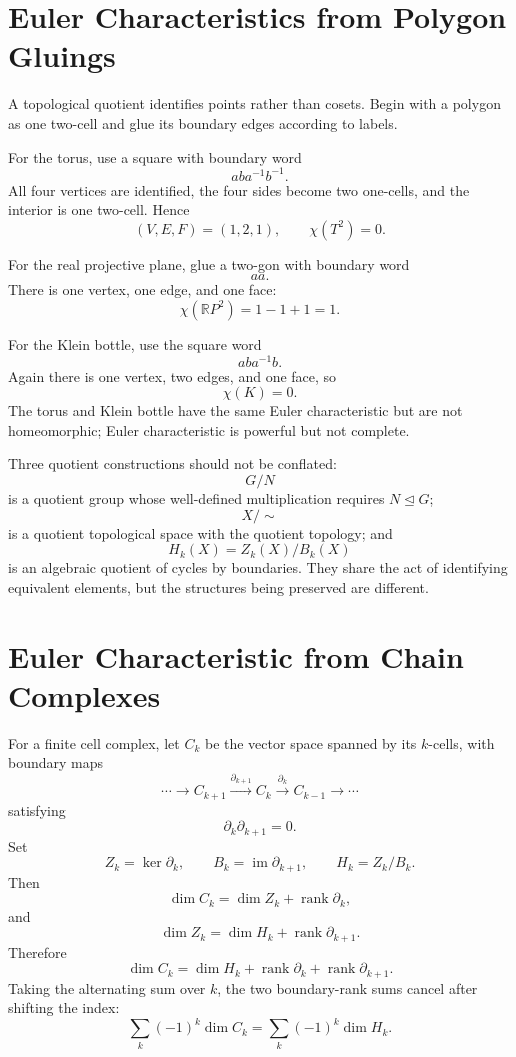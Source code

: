 \section{Euler Characteristics from Polygon Gluings}

A topological quotient identifies points rather than cosets.  Begin with a polygon as one two-cell and glue its boundary edges according to labels.

For the torus, use a square with boundary word
\[
  aba^{-1}b^{-1}.
\]
All four vertices are identified, the four sides become two one-cells, and the interior is one two-cell.  Hence
\[
  (V,E,F)=(1,2,1),
  \qquad
  \chi(T^2)=0.
\]

For the real projective plane, glue a two-gon with boundary word
\[
  aa.
\]
There is one vertex, one edge, and one face:
\[
  \chi(\mathbb RP^2)=1-1+1=1.
\]

For the Klein bottle, use the square word
\[
  aba^{-1}b.
\]
Again there is one vertex, two edges, and one face, so
\[
  \chi(K)=0.
\]
The torus and Klein bottle have the same Euler characteristic but are not homeomorphic; Euler characteristic is powerful but not complete.

Three quotient constructions should not be conflated:
\[
  G/N
\]
is a quotient group whose well-defined multiplication requires \(N\trianglelefteq G\);
\[
  X/{\sim}
\]
is a quotient topological space with the quotient topology; and
\[
  H_k(X)=Z_k(X)/B_k(X)
\]
is an algebraic quotient of cycles by boundaries.  They share the act of identifying equivalent elements, but the structures being preserved are different.

\section{Euler Characteristic from Chain Complexes}

For a finite cell complex, let \(C_k\) be the vector space spanned by its \(k\)-cells, with boundary maps
\[
  \cdots\longrightarrow C_{k+1}
  \xrightarrow{\partial_{k+1}}C_k
  \xrightarrow{\partial_k}C_{k-1}\longrightarrow\cdots
\]
satisfying
\[
  \partial_k\partial_{k+1}=0.
\]
Set
\[
  Z_k=\ker\partial_k,
  \qquad
  B_k=\operatorname{im}\partial_{k+1},
  \qquad
  H_k=Z_k/B_k.
\]
Then
\[
  \dim C_k
  =\dim Z_k+\operatorname{rank}\partial_k,
\]
and
\[
  \dim Z_k
  =\dim H_k+\operatorname{rank}\partial_{k+1}.
\]
Therefore
\[
  \dim C_k
  =\dim H_k
   +\operatorname{rank}\partial_k
   +\operatorname{rank}\partial_{k+1}.
\]
Taking the alternating sum over \(k\), the two boundary-rank sums cancel after shifting the index:
\[
  \boxed{
  \sum_k(-1)^k\dim C_k
  =\sum_k(-1)^k\dim H_k.}
\]

